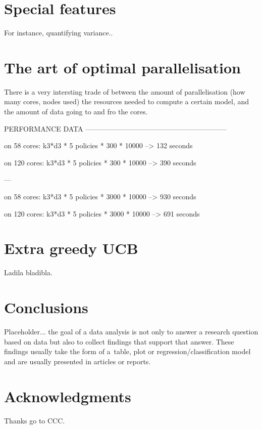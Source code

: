 \documentclass[nojss]{jss}\usepackage[]{graphicx}\usepackage[]{color}
\begin{document}
\section{Special features}

For instance, quantifying variance..

\section{The art of optimal parallelisation}

There is a very intersting trade of between the amount of parallelisation (how many cores, nodes used) the resources needed to compute a certain model, and the amount of data going to and fro the cores.

PERFORMANCE DATA  ------------------------------------------------------------

on 58  cores:    k3*d3 * 5 policies * 300  * 10000 --\textgreater{} 132 seconds

on 120 cores:    k3*d3 * 5 policies * 300  * 10000 --\textgreater{} 390 seconds

---

on 58  cores:    k3*d3 * 5 policies * 3000 * 10000 --\textgreater{} 930 seconds

on 120 cores:    k3*d3 * 5 policies * 3000 * 10000 --\textgreater{} 691 seconds



\section{Extra greedy UCB}

Ladila bladibla.

\section{Conclusions}
\label{sec:conc4}


Placeholder... the goal of a data analysis is not only to answer a research question based on data but also to collect findings that support that answer. These findings usually take the form of a~table, plot or regression/classification model and are usually presented in articles or reports.

\section{Acknowledgments}

Thanks go to CCC.

%

\end{document}
